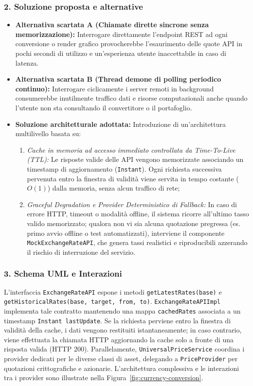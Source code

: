 \documentclass[11pt,a4paper,openright]{report}
\begin{document}
\subsubsection*{2. Soluzione proposta e alternative}
\begin{itemize}
  \item \textbf{Alternativa scartata A (Chiamate dirette sincrone senza memorizzazione):} Interrogare direttamente l'endpoint REST ad ogni conversione o render grafico provocherebbe l'esaurimento delle quote API in pochi secondi di utilizzo e un'esperienza utente inaccettabile in caso di latenza.
  \item \textbf{Alternativa scartata B (Thread demone di polling periodico continuo):} Interrogare ciclicamente i server remoti in background consumerebbe inutilmente traffico dati e risorse computazionali anche quando l'utente non sta consultando il convertitore o il portafoglio.
  \item \textbf{Soluzione architetturale adottata:} Introduzione di un'architettura multilivello basata su:
  \begin{enumerate}
    \item \emph{Cache in memoria ad accesso immediato controllata da Time-To-Live (TTL):} Le risposte valide delle API vengono memorizzate associando un timestamp di aggiornamento (\texttt{Instant}). Ogni richiesta successiva pervenuta entro la finestra di validità viene servita in tempo costante ($O(1)$) dalla memoria, senza alcun traffico di rete;
    \item \emph{Graceful Degradation e Provider Deterministico di Fallback:} In caso di errore HTTP, timeout o modalità offline, il sistema ricorre all'ultimo tasso valido memorizzato; qualora non vi sia alcuna quotazione pregressa (es. primo avvio offline o test automatizzati), interviene il componente \texttt{MockExchangeRateAPI}, che genera tassi realistici e riproducibili azzerando il rischio di interruzione del servizio.
  \end{enumerate}
\end{itemize}

\subsubsection*{3. Schema UML e Interazioni}
L'interfaccia \texttt{ExchangeRateAPI} espone i metodi \texttt{getLatestRates(base)} e \texttt{getHistoricalRates(base, target, from, to)}.
\texttt{ExchangeRateAPIImpl} implementa tale contratto mantenendo una mappa \texttt{cachedRates} associata a un timestamp \texttt{Instant lastUpdate}. Se la richiesta perviene entro la finestra di validità della cache, i dati vengono restituiti istantaneamente; in caso contrario, viene effettuata la chiamata HTTP aggiornando la cache solo a fronte di una risposta valida (HTTP 200). Parallelamente, \texttt{UniversalPriceService} coordina i provider dedicati per le diverse classi di asset, delegando a \texttt{PriceProvider} per quotazioni crittografiche e azionarie. L'architettura complessiva e le interazioni tra i provider sono illustrate nella Figura~\ref{fig:currency-conversion}.
\end{document}

